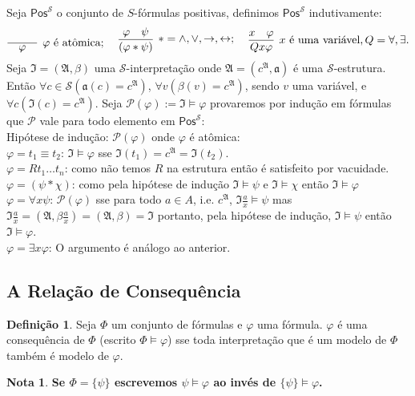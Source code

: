 \documentclass[11pt]{article}
\theoremstyle{definition}
\newtheorem{defn}{Definição}
\newtheorem{note}{Nota}
\newcommand{\sse}{\leftrightarrow}
\newcommand{\mc}[1]{\mathcal{#1}}
\newcommand{\mf}[1]{\mathfrak{#1}}
\newcommand{\msf}[1]{\mathsf{#1}}
\begin{document}
Seja $\msf{Pos}^\mc{S}$ o conjunto de $S$-fórmulas positivas, definimos $\msf{Pos}^\mc{S}$ indutivamente:
\[
\infer[\varphi\text{ é atômica};]{\varphi}{\phantom{aaaaa}}~~~~\infer[*=\wedge,\vee,\to,\sse;]{(\varphi*\psi)}{\varphi & \psi}~~~~\infer[x\text{ é uma variável},Q=\forall,\exists.]{Qx\varphi}{x & \varphi}
\]
Seja $\mf{I}=(\mf{A},\beta)$ uma $\mc{S}$-interpretação onde $\mf{A}=(c^\mf{A},\mf{a})$ é uma $\mc{S}$-estrutura. Então $\forall c\in\mc{S}\left(\mf{a}(c)=c^\mf{A}\right)$, $\forall v\left(\beta(v)=c^\mf{A}\right)$, sendo $v$ uma variável, e $\forall c\left(\mf{I}(c)=c^\mf{A}\right)$. Seja $\mc{P}(\varphi):=\mf{I}\vDash\varphi$ provaremos por indução em fórmulas que $\mc{P}$ vale para todo elemento em $\msf{Pos}^\mc{S}$:\\
Hipótese de indução: $\mc{P}(\varphi)$ onde $\varphi$ é atômica:\\
$\varphi=t_1\equiv t_2$: $\mf{I}\vDash\varphi$ sse $\mf{I}(t_1)=c^\mf{A}=\mf{I}(t_2)$.\\
$\varphi=Rt_1\dots t_n$: como não temos $R$ na estrutura então é satisfeito por vacuidade.\\
$\varphi=(\psi*\chi)$: como pela hipótese de indução $\mf{I}\vDash\psi$ e $\mf{I}\vDash\chi$ então $\mf{I}\vDash\varphi$\\
$\varphi=\forall x\psi$: $\mc{P}(\varphi)$ sse para todo $a\in A$, i.e. $c^\mf{A}$, $\mf{I}\frac{a}{x}\vDash\psi$ mas $\mf{I}\frac{a}{x}=(\mf{A},\beta\frac{a}{x})=(\mf{A},\beta)=\mf{I}$ portanto, pela hipótese de indução, $\mf{I}\vDash\psi$ então $\mf{I}\vDash\varphi$.\\
$\varphi=\exists x\varphi$: O argumento é análogo ao anterior.

\subsection{A Relação de Consequência}

\begin{shaded}
\begin{defn}
Seja $\Phi$ um conjunto de fórmulas e $\varphi$ uma fórmula. $\varphi$ é uma consequência de $\Phi$ (escrito $\Phi\vDash\varphi$) sse toda interpretação que é um modelo de $\Phi$ também é modelo de $\varphi$.
\end{defn}
\end{shaded}

\begin{note}
\textbf{Se $\Phi=\{\psi\}$ escrevemos $\psi\vDash\varphi$ ao invés de $\{\psi\}\vDash\varphi$.}
\end{note}
\end{document}
